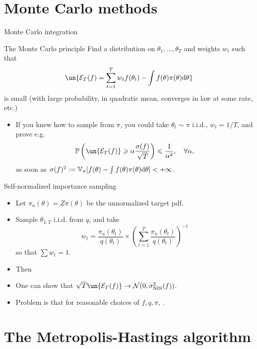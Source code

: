 \documentclass[10pt]{beamer}
\begin{document}
\section{Monte Carlo methods}
\begin{frame}{Monte Carlo integration}
\begin{block}{The Monte Carlo principle}
Find a distribution on $\theta_1,\dots,\theta_T$ and weights $w_t$ such that
$$ \un{\mathcal{E}_T(f) =  \sum_{t=1}^T w_t f(\theta_t) - \int f(\theta)\pi(\theta)\d \theta}$$
is small (with large probability, in quadratic mean, converges in law at some rate, etc.)
\end{block}
\begin{itemize}
  \item If you knew how to sample from $\pi$, you could take $\theta_t\sim\pi$ i.i.d., $w_t=1/T$, and prove e.g.
  $$ \mathbb{P}\left( \un{\mathcal{E}_T(f)} \geq \alpha\frac{\sigma(f)}{\sqrt{T}} \right) \leq \frac{1}{\alpha^2}, \quad \forall \alpha,$$
  as soon as $\sigma(f)^2 := \mathbb{V}_\pi [f(\theta) - \int f(\theta)\pi(\theta){\rm d}\theta]<+\infty$.
\end{itemize}
\end{frame}

\begin{frame}{Self-normalized importance sampling}
\begin{itemize}
  \item Let $\pi_u(\theta) = Z\pi(\theta)$ be the unnormalized target pdf.
  \item Sample $\theta_{1:T}$ i.i.d. from $q$, and take
  $$
  w_t = \frac{\pi_u(\theta_t)}{q(\theta_t)} \times \left( \sum_{t=1}^T \frac{\pi_u(\theta_t)}{q(\theta_t)} \right)^{-1}
  $$
  so that $\sum w_t = 1$.
  \item Then
  $$$$
  \vfill
  \item One can show that $ \sqrt{T}\un{\mathcal{E}_T(f)} \rightarrow \cN(0, \sigma^2_{\text{NIS}}(f))$.
  \item Problem is that for reasonable choices of $f,q,\pi$, .
\end{itemize}
\end{frame}

\section{The Metropolis-Hastings algorithm}
\end{document}
